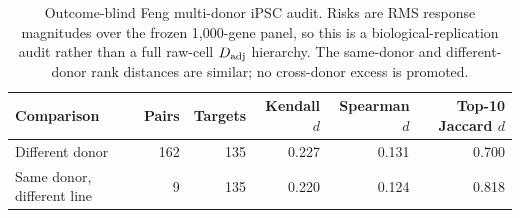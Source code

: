 \begin{table}[t]
\centering
\small
\setlength{\tabcolsep}{3.5pt}
\caption{Outcome-blind Feng multi-donor iPSC audit. Risks are RMS response magnitudes over the frozen 1,000-gene panel, so this is a biological-replication audit rather than a full raw-cell $D_{\rm adj}$ hierarchy. The same-donor and different-donor rank distances are similar; no cross-donor excess is promoted.}
\label{tab:v3-feng}
\begin{tabular}{lrrrrr}
\toprule
Comparison & Pairs & Targets & Kendall $d$ & Spearman $d$ & Top-10 Jaccard $d$ \\
\midrule
Different donor & 162 & 135 & 0.227 & 0.131 & 0.700 \\
Same donor, different line & 9 & 135 & 0.220 & 0.124 & 0.818 \\
\bottomrule
\end{tabular}
\end{table}
